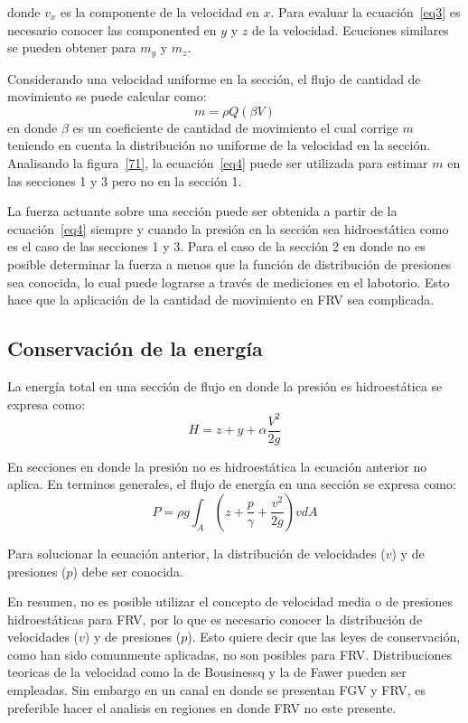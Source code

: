 \documentclass[11pt, oneside]{article}
\begin{document}
donde $v_x$ es la componente de la velocidad en $x$. Para evaluar la ecuaci\'on~\ref{eq3} es necesario conocer las componented en $y$ y $z$ de la velocidad. Ecuciones similares se pueden obtener para $m_y$ y $m_z$.

Considerando una velocidad uniforme en la secci\'on, el flujo de cantidad de movimiento se puede calcular como:
\begin{equation}
    m = \rho Q \left( \beta V \right)
\label{eq4}
\end{equation}
en donde $\beta$ es un coeficiente de cantidad de movimiento el cual corrige $m$ teniendo en cuenta la distribuci\'on no uniforme de la velocidad en la secci\'on. Analisando la figura~\ref{71}, la ecuaci\'on~\ref{eq4} puede ser utilizada para estimar $m$ en las secciones 1 y 3 pero no en la secci\'on 1. 

La fuerza actuante sobre una secci\'on puede ser obtenida a partir de la ecuaci\'on~\ref{eq4} siempre y cuando la presi\'on en la secci\'on sea hidroest\'atica como es el caso de las secciones 1 y 3. Para el caso de la secci\'on 2 en donde no es posible determinar la fuerza  a menos que la funci\'on de distribuci\'on de presiones sea conocida, lo cual puede lograrse a trav\'es de mediciones en el labotorio.  Esto hace que la aplicaci\'on de la cantidad de movimiento en FRV sea complicada. 


\subsection{Conservaci\'on de la energ\'ia}
La energ\'ia total en una secci\'on de flujo en donde la presi\'on es hidroest\'atica se expresa como:
\begin{equation}
    H = z + y + \alpha \frac{V^2}{2g}
\label{eq5}
\end{equation}

En secciones en donde la presi\'on no es hidroest\'atica la ecuaci\'on anterior no aplica. En terminos generales, el flujo de energ\'ia en una secci\'on se expresa como:
\begin{equation}
    P = \rho g \int_A \left( z + \frac{p}{\gamma} + \frac{v^2}{2g} \right) v dA
\label{eq6}
\end{equation}

Para solucionar la ecuaci\'on anterior, la distribuci\'on de velocidades ($v$) y de presiones ($p$) debe ser conocida.

En resumen, no es posible utilizar el concepto de velocidad media o de presiones hidroest\'aticas para FRV, por lo que es necesario conocer la distribuci\'on de velocidades ($v$) y de presiones ($p$). Esto quiere decir que las leyes de conservaci\'on, como han sido comunmente aplicadas, no son posibles para FRV. Distribuciones teoricas de la velocidad como la de Bousinessq y la de Fawer pueden ser empleadas. Sin embargo en un canal en donde se presentan FGV y FRV, es preferible hacer el analisis en regiones en donde FRV no este presente. 
\end{document}
